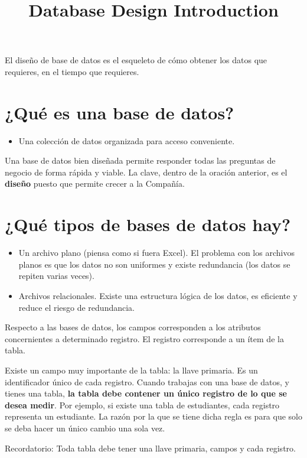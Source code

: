 \documentclass[11pt]{article}
\title{Database Design Introduction}
\begin{document}
\maketitle

El diseño de base de datos es el esqueleto de cómo obtener los datos que requieres, en el tiempo que requieres.
\section{¿Qué es una base de datos?}
\begin{itemize}
	\item Una colección de datos organizada para acceso conveniente.
\end{itemize}

Una base de datos bien diseñada permite responder todas las preguntas de negocio de forma rápida y viable. La clave, dentro de la oración anterior, es el \textbf{diseño} puesto que permite crecer a la Compañía.

\section{¿Qué tipos de bases de datos hay?}
\begin{itemize}
	\item Un archivo plano (piensa como si fuera Excel). El problema con los archivos planos es que los datos no son uniformes y existe redundancia (los datos se repiten varias veces). 
	\item Archivos relacionales. Existe una estructura lógica de los datos, es eficiente y reduce el riesgo de redundancia.
\end{itemize}

Respecto a las bases de datos, los campos corresponden a los atributos concernientes a determinado registro. El registro corresponde a un ítem de la tabla.

Existe un campo muy importante de la tabla: la llave primaria. Es un identificador único de cada registro. Cuando trabajas con una base de datos, y tienes una tabla, \textbf{la tabla debe contener un único registro de lo que se desea medir}. Por ejemplo, si existe una tabla de estudiantes, cada registro representa un estudiante. La razón por la que se tiene dicha regla es para que solo se deba hacer un único cambio una sola vez.

Recordatorio: Toda tabla debe tener una llave primaria, campos y cada registro.
\end{document}
